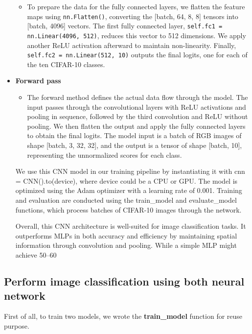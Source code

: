 \documentclass[a4paper,12pt]{article}
\begin{document}
\begin{itemize}
\begin{itemize}
        \item To prepare the data for the fully connected layers, we flatten the feature maps using \verb|nn.Flatten()|, converting the [batch, 64, 8, 8] tensors into [batch, 4096] vectors. The first fully connected layer, \verb|self.fc1 = nn.Linear(4096, 512)|, reduces this vector to 512 dimensions. We apply another ReLU activation afterward to maintain non-linearity. Finally, \verb|self.fc2 = nn.Linear(512, 10)| outputs the final logits, one for each of the ten CIFAR-10 classes.
    \end{itemize}

    \item \textbf{Forward pass}
    \begin{itemize}
        \item The forward method defines the actual data flow through the model. The input passes through the convolutional layers with ReLU activations and pooling in sequence, followed by the third convolution and ReLU without pooling. We then flatten the output and apply the fully connected layers to obtain the final logits. The model input is a batch of RGB images of shape [batch, 3, 32, 32], and the output is a tensor of shape [batch, 10], representing the unnormalized scores for each class.
    \end{itemize}

    We use this CNN model in our training pipeline by instantiating it with cnn = CNN().to(device), where device could be a CPU or GPU. The model is optimized using the Adam optimizer with a learning rate of 0.001. Training and evaluation are conducted using the train\_model and evaluate\_model functions, which process batches of CIFAR-10 images through the network.

    Overall, this CNN architecture is well-suited for image classification tasks. It outperforms MLPs in both accuracy and efficiency by maintaining spatial information through convolution and pooling. While a simple MLP might achieve 50–60%
\end{itemize}
\newpage

\subsection{Perform image classification using both neural network}
First of all, to train two models, we wrote the \textbf{train\_model} function for reuse purpose.
\end{document}
